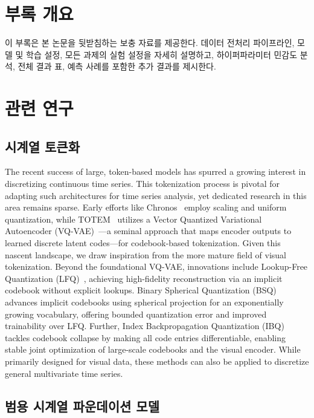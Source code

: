 
\section*{부록 개요}

이 부록은 본 논문을 뒷받침하는 보충 자료를 제공한다. 데이터 전처리 파이프라인, 모델 및 학습 설정, 모든 과제의 실험 설정을 자세히 설명하고, 하이퍼파라미터 민감도 분석, 전체 결과 표, 예측 사례를 포함한 추가 결과를 제시한다.

\section{관련 연구}

\subsection{시계열 토큰화}

The recent success of large, token-based models has spurred a growing interest in discretizing continuous time series. This tokenization process is pivotal for adapting such architectures for time series analysis, yet dedicated research in this area remains sparse. Early efforts like Chronos~\cite{ansari2024chronos} employ scaling and uniform quantization, while TOTEM~\cite{talukder2024totem} utilizes a Vector Quantized Variational Autoencoder (VQ-VAE)~\cite{van2017neural}—a seminal approach that maps encoder outputs to learned discrete latent codes—for codebook-based tokenization. Given this nascent landscape, we draw inspiration from the more mature field of visual tokenization. Beyond the foundational VQ-VAE, innovations include Lookup-Free Quantization (LFQ)~\cite{yu2023language}, achieving high-fidelity reconstruction via an implicit codebook without explicit lookups. Binary Spherical Quantization (BSQ)~\cite{zhao2024image} advances implicit codebooks using spherical projection for an exponentially growing vocabulary, offering bounded quantization error and improved trainability over LFQ. Further, Index Backpropagation Quantization (IBQ)~\cite{shi2025scalableimagetokenizationindex} tackles codebook collapse by making all code entries differentiable, enabling stable joint optimization of large-scale codebooks and the visual encoder. While primarily designed for visual data, these methods can also be applied to discretize general multivariate time series.

\subsection{범용 시계열 파운데이션 모델}

